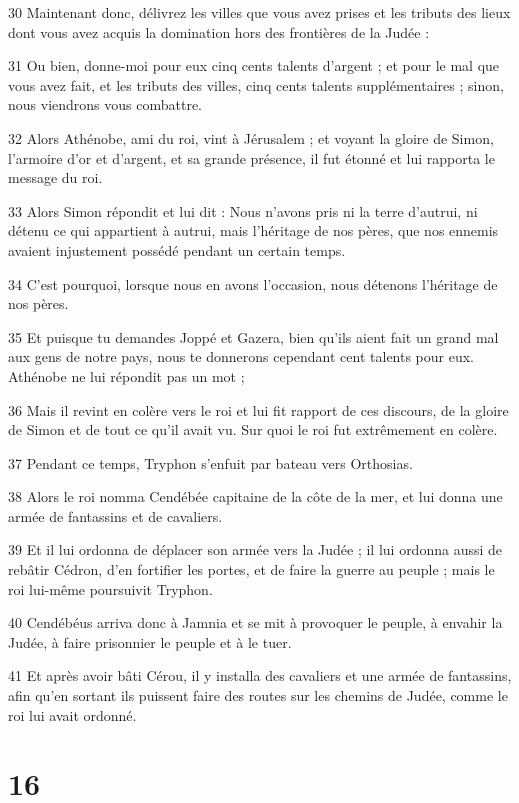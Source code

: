 \par 30 Maintenant donc, délivrez les villes que vous avez prises et les tributs des lieux dont vous avez acquis la domination hors des frontières de la Judée :
\par 31 Ou bien, donne-moi pour eux cinq cents talents d'argent ; et pour le mal que vous avez fait, et les tributs des villes, cinq cents talents supplémentaires ; sinon, nous viendrons vous combattre.
\par 32 Alors Athénobe, ami du roi, vint à Jérusalem ; et voyant la gloire de Simon, l'armoire d'or et d'argent, et sa grande présence, il fut étonné et lui rapporta le message du roi.
\par 33 Alors Simon répondit et lui dit : Nous n'avons pris ni la terre d'autrui, ni détenu ce qui appartient à autrui, mais l'héritage de nos pères, que nos ennemis avaient injustement possédé pendant un certain temps.
\par 34 C'est pourquoi, lorsque nous en avons l'occasion, nous détenons l'héritage de nos pères.
\par 35 Et puisque tu demandes Joppé et Gazera, bien qu'ils aient fait un grand mal aux gens de notre pays, nous te donnerons cependant cent talents pour eux. Athénobe ne lui répondit pas un mot ;
\par 36 Mais il revint en colère vers le roi et lui fit rapport de ces discours, de la gloire de Simon et de tout ce qu'il avait vu. Sur quoi le roi fut extrêmement en colère.
\par 37 Pendant ce temps, Tryphon s'enfuit par bateau vers Orthosias.
\par 38 Alors le roi nomma Cendébée capitaine de la côte de la mer, et lui donna une armée de fantassins et de cavaliers.
\par 39 Et il lui ordonna de déplacer son armée vers la Judée ; il lui ordonna aussi de rebâtir Cédron, d'en fortifier les portes, et de faire la guerre au peuple ; mais le roi lui-même poursuivit Tryphon.
\par 40 Cendébéus arriva donc à Jamnia et se mit à provoquer le peuple, à envahir la Judée, à faire prisonnier le peuple et à le tuer.
\par 41 Et après avoir bâti Cérou, il y installa des cavaliers et une armée de fantassins, afin qu'en sortant ils puissent faire des routes sur les chemins de Judée, comme le roi lui avait ordonné.

\chapter{16}

